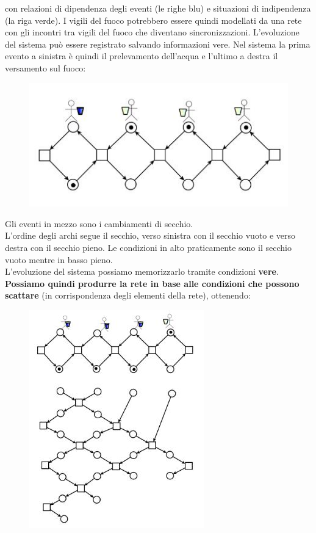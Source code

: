 con relazioni di dipendenza degli eventi (le righe blu) e situazioni di
indipendenza (la riga verde).
I vigili del fuoco potrebbero essere quindi
modellati da una rete con gli incontri tra vigili del fuoco che diventano
sincronizzazioni. L'evoluzione del sistema può essere registrato salvando
informazioni vere. Nel sistema la prima evento a sinistra è quindi il
prelevamento dell'acqua e l'ultimo a destra il versamento sul fuoco:
\begin{figure}[H]
  \centering
  \includegraphics[scale = 0.5]{img/inc.jpg} 
\end{figure}
Gli eventi in mezzo sono i cambiamenti di secchio.\\
L'ordine degli archi segue il secchio, verso sinistra con il secchio vuoto e
verso destra con il secchio pieno. Le condizioni in alto praticamente sono il
secchio vuoto mentre in basso pieno.\\
L'evoluzione del sistema possiamo memorizzarlo tramite condizioni \textbf{vere}. 
\textbf{Possiamo quindi produrre la rete in base alle condizioni che possono scattare}
(in corrispondenza degli elementi della rete),
ottenendo:
\begin{figure}[H]
  \centering
  \includegraphics[scale = 0.7]{img/inc2.jpg} 
\end{figure}
